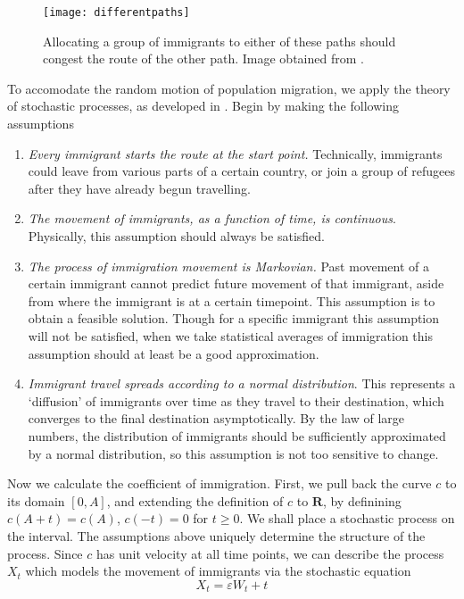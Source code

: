 \documentclass{article}
\begin{document}
\begin{figure}[h]
\begin{center}
\texttt{[image: differentpaths]}
\caption{Allocating a group of immigrants to either of these paths should congest the route of the other path. Image obtained from \cite{twocurve}.}
\end{center}
\end{figure}

To accomodate the random motion of population migration, we apply the theory of stochastic processes, as developed in \cite{lawler}. Begin by making the following assumptions
%
\begin{enumerate}
    \item {\it Every immigrant starts the route at the start point.} Technically, immigrants could leave from various parts of a certain country, or join a group of refugees after they have already begun travelling.
    \item {\it The movement of immigrants, as a function of time, is continuous}. Physically, this assumption should always be satisfied.
    \item {\it The process of immigration movement is Markovian.} Past movement of a certain immigrant cannot predict future movement of that immigrant, aside from where the immigrant is at a certain timepoint. This assumption is to obtain a feasible solution. Though for a specific immigrant this assumption will not be satisfied, when we take statistical averages of immigration this assumption should at least be a good approximation.
    \item {\it Immigrant travel spreads according to a normal distribution}. This represents a `diffusion' of immigrants over time as they travel to their destination, which converges to the final destination asymptotically. By the law of large numbers, the distribution of immigrants should be sufficiently approximated by a normal distribution, so this assumption is not too sensitive to change.
\end{enumerate}
%
Now we calculate the coefficient of immigration. First, we pull back the curve $c$ to its domain $[0,A]$, and extending the definition of $c$ to $\mathbf{R}$, by definining $c(A + t) = c(A)$, $c(-t) = 0$ for $t \geq 0$. We shall place a stochastic process on the interval. The assumptions above uniquely determine the structure of the process. Since $c$ has unit velocity at all time points, we can describe the process $X_t$ which models the movement of immigrants via the stochastic equation
%
\[ X_t = \varepsilon W_t + t \]
\end{document}

